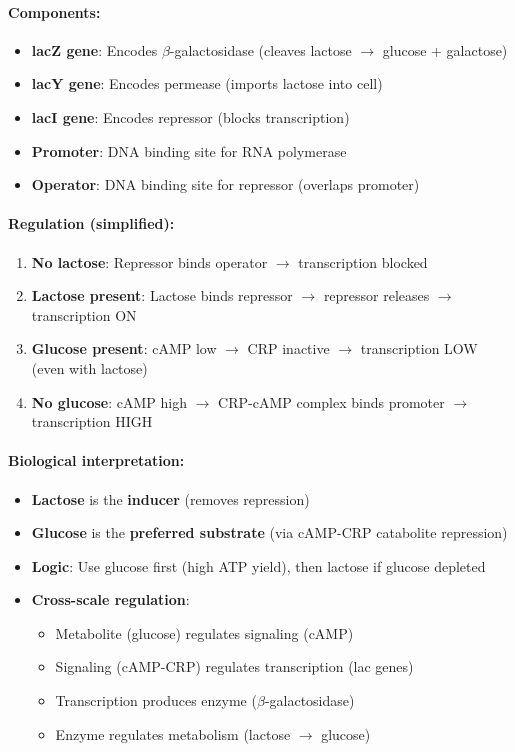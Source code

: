 \paragraph{Components:}
\begin{itemize}
    \item \textbf{lacZ gene}: Encodes $\beta$-galactosidase (cleaves lactose $\to$ glucose + galactose)
    \item \textbf{lacY gene}: Encodes permease (imports lactose into cell)
    \item \textbf{lacI gene}: Encodes repressor (blocks transcription)
    \item \textbf{Promoter}: DNA binding site for RNA polymerase
    \item \textbf{Operator}: DNA binding site for repressor (overlaps promoter)
\end{itemize}

\paragraph{Regulation (simplified):}
\begin{enumerate}
    \item \textbf{No lactose}: Repressor binds operator $\to$ transcription blocked
    \item \textbf{Lactose present}: Lactose binds repressor $\to$ repressor releases $\to$ transcription ON
    \item \textbf{Glucose present}: cAMP low $\to$ CRP inactive $\to$ transcription LOW (even with lactose)
    \item \textbf{No glucose}: cAMP high $\to$ CRP-cAMP complex binds promoter $\to$ transcription HIGH
\end{enumerate}

\paragraph{Biological interpretation:}
\begin{itemize}
    \item \textbf{Lactose} is the \textbf{inducer} (removes repression)
    \item \textbf{Glucose} is the \textbf{preferred substrate} (via cAMP-CRP catabolite repression)
    \item \textbf{Logic}: Use glucose first (high ATP yield), then lactose if glucose depleted
    \item \textbf{Cross-scale regulation}:
    \begin{itemize}
        \item Metabolite (glucose) regulates signaling (cAMP)
        \item Signaling (cAMP-CRP) regulates transcription (lac genes)
        \item Transcription produces enzyme ($\beta$-galactosidase)
        \item Enzyme regulates metabolism (lactose $\to$ glucose)
    \end{itemize}
\end{itemize}

